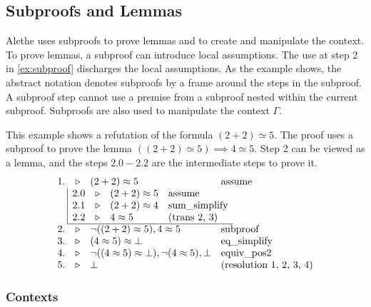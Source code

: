 \subsection{Subproofs and Lemmas}
\label{ssec:subproof-desc}

Alethe uses subproofs to prove lemmas and to create and manipulate the context. To prove lemmas, a subproof can introduce
local assumptions. The  use at step 2 in \cref{ex:subproof} discharges the local assumptions.
As the example shows, the abstract notation denotes subproofs by a frame around the steps in the subproof.
A subproof step cannot use a premise from a subproof nested within the current subproof.
Subproofs are also used to manipulate the context \colorbox{blue!30}{$\Gamma$}.

\begin{example}\label{ex:subproof}
This example shows a refutation of the formula $(2 + 2 ) \simeq 5$. The proof uses a subproof to prove the lemma $((2 + 2 ) \simeq 5) \implies 4 \simeq 5$.
Step 2 can be viewed as a lemma, and the steps $2.0 - 2.2$ are the intermediate steps to prove it.
\[
\begin{array}{r c l l}
1. & \triangleright & (2 + 2) \approx 5 & \text{assume} \\
\multicolumn{4}{l}{%
\begin{array}{r |r c l l}
& 2.0 & \triangleright & (2 + 2) \approx 5 & \text{assume} \\
& 2.1 & \triangleright & (2 + 2) \approx 4 & \text{sum\_simplify} \\
& 2.2 & \triangleright & 4 \approx 5 & \text{(trans 2, 3)} \\
\cline{2-5}
\end{array}
} \\
2. & \triangleright & \neg((2 + 2) \approx 5), 4 \approx 5 & \text{subproof} \\
3. & \triangleright & (4 \approx 5) \approx \bot & \text{eq\_simplify} \\
4. & \triangleright & \neg((4 \approx 5) \approx \bot), \neg(4 \approx 5), \bot & \text{equiv\_pos2} \\
5. & \triangleright & \bot & \text{(resolution 1, 2, 3, 4)}
\end{array}
\]
\end{example}

\subsubsection{Contexts}

